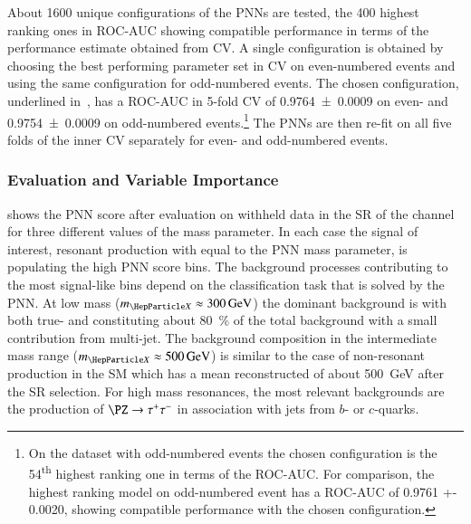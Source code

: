 About 1600 unique configurations of the PNNs are tested, the 400
highest ranking ones in ROC-AUC showing compatible performance in
terms of the performance estimate obtained from CV. A single
configuration is obtained by choosing the best performing parameter
set in CV on even-numbered events and using the same configuration for
odd-numbered events. The chosen configuration, underlined
in~, has a ROC-AUC in 5-fold CV of
\num{0.9764 +- 0.0009} on even- and \num{0.9754 +- 0.0009} on
odd-numbered events.\footnote{On the dataset with odd-numbered events
  the chosen configuration is the 54\textsuperscript{th} highest
  ranking one in terms of the ROC-AUC. For comparison, the highest
  ranking model on odd-numbered event has a ROC-AUC of \num{0.9761 +-
    0.0020}, showing compatible performance with the chosen
  configuration.} The PNNs are then re-fit on all five folds of the
inner CV separately for even- and odd-numbered events.

\subsubsection{Evaluation and Variable Importance}

 shows the PNN score after evaluation on
withheld data in the SR of the \hadhad channel for three
different values of the mass parameter. In each case the signal of
interest, resonant \HH production with \mX equal to the PNN mass
parameter, is populating the high PNN score bins. The background
processes contributing to the most signal-like bins depend on the
classification task that is solved by the PNN. At low mass
($\mX \approx \SI{300}{\GeV}$) the dominant background is \ttbar with
both true- and \faketauhadvis constituting about \SI{80}{\percent} of
the total background with a small contribution from multi-jet.  The
background composition in the intermediate mass range
($\mX \approx \SI{500}{\GeV}$) is similar to the case of non-resonant
\HH production in the SM which has a mean reconstructed \mHH of about
\SI{500}{\GeV} after the SR selection. For high mass
resonances, the most relevant backgrounds are the production of
$\PZ \to \tautau$ in association with jets from $b$- or $c$-quarks.

